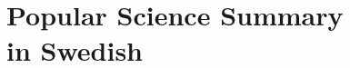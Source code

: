 \documentclass[11pt, twoside, openright]{book}
\theoremstyle{definition}
\newcommand{\paperref}[1]{Paper~\ref{#1}}
\newif\ifpopvetOnly
\newif\ifcontributionStatementOnly
\newif\ifpaperI %
\newif\ifpaperII %
\newif\ifpaperIII %
\newif\ifpaperIV %
\newif\ifpaperV %
\newif\ifpaperVI %
\newcommand{\paperItitle}{Secure Ownership Transfer for the Internet of Things}
\newcommand{\paperIItitle}{An Identity Privacy Preserving IoT Data Protection Scheme for Cloud Based Analytics}
\begin{document}
\setcounter{chapter}{0}
\renewcommand{\chaptername}{Paper}
\fancyhead[LO]{\rightmark}

\ifpaperI
\newrefsegment
\fancyhead[RE]{\paperref{ch:ot}: \paperItitle}

\fi

\ifpaperII
\newrefsegment
\addtolength{\apa}{2cm}
\fancyhead[RE]{\paperref{ch:ppiot}: \paperIItitle}

\fi

\ifpaperIII
\newrefsegment
\addtolength{\apa}{2cm}
\fancyhead[RE]{\paperref{ch:trustanchors}: \paperIIItitle}

\fi

\ifpaperIV
\newrefsegment
\addtolength{\apa}{2cm}
\fancyhead[RE]{\paperref{ch:recsys}: \paperIVtitle}

\fi

\ifpaperV
\newrefsegment
\addtolength{\apa}{2cm}
\fancyhead[RE]{\paperref{ch:recsyssgx}: \paperVtitle}

\fi

\ifpaperVI
\newrefsegment
\addtolength{\apa}{2cm}
\fancyhead[RE]{\truncate{.95\headwidth}{\paperref{ch:slightlygreedy}: \paperVItitle}}

\fi

\part[Popular Science Summary in Swedish]{\texorpdfstring{%
Popular Science Summary\\in Swedish}{%
Popular Science Summary in Swedish}}

\fi

\fi

\makeatletter
\def\@makeschapterhead#1{%
  \vspace*{10\p@}%
  {\parindent \z@ \raggedleft \reset@font
            \sffamily \bfseries \vphantom{\@chapapp{} \thechapter}
        \par\nobreak
        \interlinepenalty\@M
    \Huge  #1\par\nobreak
    \hrulefill
    \par\nobreak
    \vskip 16\p@
  }}
\makeatother


\end{document}

